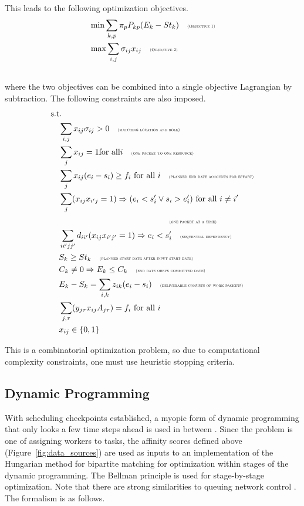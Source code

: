 \documentclass[10pt,journal,cspaper,compsoc]{IEEEtran}
\begin{document}
This leads to the following optimization objectives.
\begin{align*}
&\min \sum_{k,p}\pi_p P_{kp} (E_k - St_k) \quad\mbox{{\sc{\tiny(Objective 1)}}} \\ \notag
&\max \sum_{i,j}\sigma_{ij} x_{ij} \quad\mbox{{\sc{\tiny(Objective 2)}}} \\ \notag
\end{align*}
where the two objectives can be combined into a single objective Lagrangian by subtraction.
The following constraints are also imposed.
\begin{align*}
&\mbox{s.t.} \\ \notag
&\quad \sum_{i,j} x_{ij} \sigma_{ij} > 0 \quad\mbox{{\sc{\tiny(matching location and role)}}}\\ \notag
&\quad \sum_{j} x_{ij}=1 \mbox{for all} i  \quad\mbox{{\sc{\tiny(one packet to one resource)}}}\\ \notag
&\quad \sum_{j} x_{ij}(e_i - s_i)\geq f_i \mbox{ for all } i  \quad\mbox{{\sc{\tiny(planned end date accounts for effort)}}}\\ \notag 
&\quad \sum_{j} (x_{ij} x_{i'j}=1)\Rightarrow (e_i<s_i'\vee s_i>e_i') \mbox{ for all } i\neq i'\\ \notag
&\hspace{2in}\mbox{{\sc{\tiny(one packet at a time)}}}\\ \notag
&\quad \sum_{ii'jj'} d_{ii'}(x_{ij} x_{i'j'}=1)\Rightarrow e_i<s_i'   \quad\mbox{{\sc{\tiny(sequential dependency)}}}\\ \notag
&\quad S_k\geq St_k \quad\mbox{{\sc{\tiny(planned start date after input start date)}}}\\ \notag
&\quad C_k\neq 0 \Rightarrow E_k\leq C_k \quad\mbox{{\sc{\tiny(end date obeys committed date)}}}\\ \notag
&\quad E_k-S_k=\sum_{i,k}z_{ik}(e_i-s_i)\quad\mbox{{\sc{\tiny(deliverable consists of work packets)}}}\\ \notag
&\quad \sum_{j,\tau} (y_{j\tau} x_{ij}A_{j\tau})=f_i \mbox{ for all } i \\ \notag
&\quad x_{ij}\in\{0,1\}
\end{align*}

This is a combinatorial optimization problem, so due to computational complexity constraints, one must 
use heuristic stopping criteria.

\subsection{Dynamic Programming}
With scheduling checkpoints established, a myopic form of dynamic programming that only looks a few time
steps ahead is used in between \cite{Bellman1957}.  Since the problem is one of assigning workers to
tasks, the affinity scores defined above (Figure~\ref{fig:data_sources}) are used as inputs to 
an implementation of the Hungarian method for bipartite matching \cite{Kuhn1955} for optimization 
within stages of the dynamic programming.  The Bellman principle is used for stage-by-stage optimization.
Note that there are strong similarities to queuing network control \cite{TehraniZ2010}.
The formalism is as follows.
\end{document}

